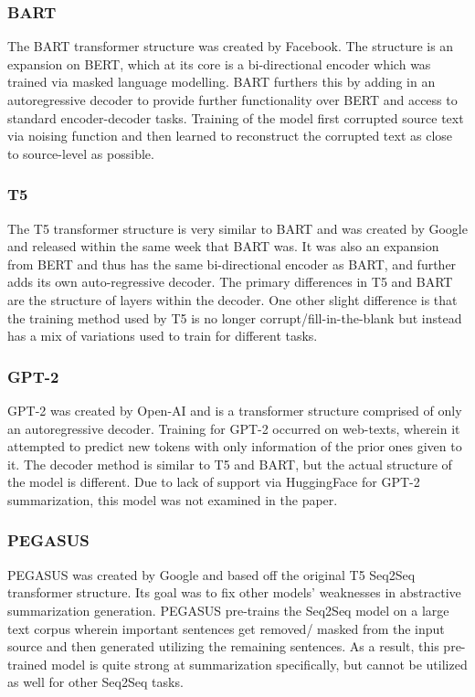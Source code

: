 \documentclass[12pt]{report}
\begin{document}
        \subsubsection{BART}
        The BART transformer structure was created by Facebook. The structure is an expansion on BERT, which at its core is a bi-directional encoder which was trained via masked language modelling. BART furthers this by adding in an autoregressive decoder to provide further functionality over BERT and access to standard encoder-decoder tasks. Training of the model first corrupted source text via noising function and then learned to reconstruct the corrupted text as close to source-level as possible.
        
        \subsubsection{T5}
        The T5 transformer structure is very similar to BART and was created by Google and released within the same week that BART was. It was also an expansion from BERT and thus has the same bi-directional encoder as BART, and further adds its own auto-regressive decoder. The primary differences in T5 and BART are the structure of layers within the decoder. One other slight difference is that the training method used by T5 is no longer corrupt/fill-in-the-blank but instead has a mix of variations used to train for different tasks.
        
        \subsubsection{GPT-2}
        GPT-2 was created by Open-AI and is a transformer structure comprised of only an autoregressive decoder. Training for GPT-2 occurred on web-texts, wherein it attempted to predict new tokens with only information of the prior ones given to it. The decoder method is similar to T5 and BART, but the actual structure of the model is different. Due to lack of support via HuggingFace for GPT-2 summarization, this model was not examined in the paper.
        
        \subsubsection{PEGASUS}
        PEGASUS was created by Google and based off the original T5 Seq2Seq transformer structure. Its goal was to fix other models' weaknesses in abstractive summarization generation. PEGASUS pre-trains the Seq2Seq model on a large text corpus wherein important sentences get removed/ masked from the input source and then generated utilizing the remaining sentences. As a result, this pre-trained model is quite strong at summarization specifically, but cannot be utilized as well for other Seq2Seq tasks.
        
\end{document}
